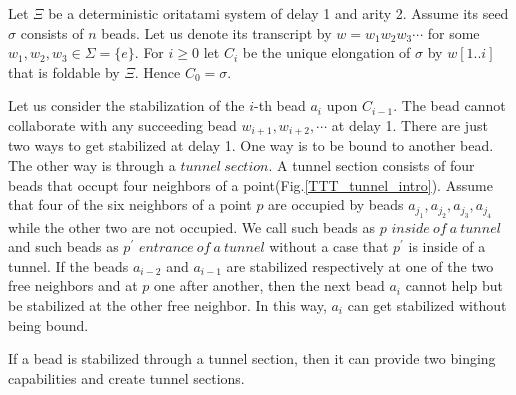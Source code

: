 \documentclass[runningheads]{llncs}
\begin{document}
Let $\Xi$ be a deterministic oritatami system of delay 1 and arity 2. Assume its seed $\sigma$ consists of $n$ beads. Let us denote its transcript by $w = w_1 w_2 w_3 \cdots$ for some $w_1,w_2,w_3 \in \Sigma = \{e\}$. For $i \geq 0$ let $C_i$ be the unique elongation of $\sigma$ by $w[1..i]$ that is foldable by $\Xi$. Hence $C_0 = \sigma$.


Let us consider the stabilization of the $i$-th bead $a_i$ upon $C_{i-1}$. The bead cannot collaborate with any succeeding bead $w_{i+1},w_{i+2},\cdots$ at delay 1. There are just two ways to get stabilized at delay 1. One way is to be bound to another bead. The other way is through a $tunnel\ section$. A tunnel section consists of four beads that occupt four neighbors of a point(Fig.\ref{TTT_tunnel_intro}). Assume that four of the six neighbors of a point $p$ are occupied by beads $a_{j_1},a_{j_2},a_{j_3},a_{j_4}$ while the other two are not occupied. We call such beads as $p$ $inside\ of\ a\ tunnel$ and such beads as $p^\prime$ $entrance\ of\ a\ tunnel$ without a case that $p^\prime$ is inside of a tunnel. If the beads $a_{i-2}$ and $a_{i-1}$ are stabilized respectively at one of the two free neighbors and at $p$ one after another, then the next bead $a_i$ cannot help but be stabilized at the other free neighbor. In this way, $a_i$ can get stabilized without being bound.



If a bead is stabilized through a tunnel section, then it can provide two binging capabilities and create tunnel sections.
\end{document}
